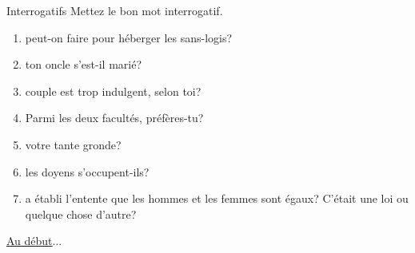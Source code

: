 \begin{frame}{Interrogatifs}
  Mettez le bon mot interrogatif.
  \begin{enumerate}
    \item \underline{} peut-on faire pour héberger les sans-logis?
    \item \underline{} ton oncle s'est-il marié?
    \item \underline{} couple est trop indulgent, selon toi?
    \item Parmi les deux facultés, \underline{} préfères-tu?
    \item \underline{} votre tante gronde?
    \item \underline{} les doyens s'occupent-ils?
    \item \underline{} a établi l'entente que les hommes et les femmes sont égaux? C'était une loi ou quelque chose d'autre?
  \end{enumerate}
  \vspace{0.25cm}
  \raggedleft\raggedleft\hyperlink{début}{Au début}...
\end{frame}